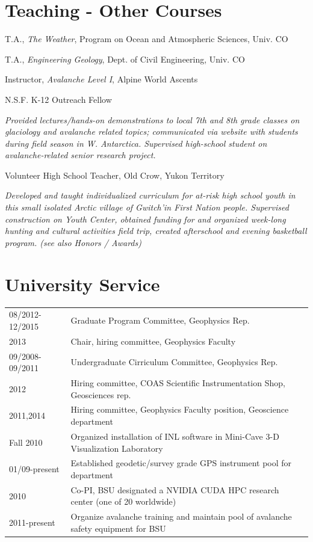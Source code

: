 \documentclass[11pt]{article}
\renewenvironment{itemize}{
  \begin{list}{}{
    \setlength{\leftmargin}{1.5em}
    \setlength{\itemsep}{0pt}
    \setlength{\parskip}{0pt}
  }
}{
  \end{list}
}
\renewcommand\arraystretch{1}
\begin{document}
\section*{Teaching - Other Courses}
\begin{itemize}
\item[01/2003-06/2003] T.A., \textit{The Weather}, Program on Ocean and Atmospheric Sciences, Univ. CO
\item[01/2000-06/2000] T.A., \textit{Engineering Geology}, Dept. of Civil Engineering, Univ. CO
\item[12/2002-12/2003] Instructor, \textit{Avalanche Level I}, Alpine World Ascents
\item[08/2001-06/2002] N.S.F. K-12 Outreach Fellow
\item \textit{Provided lectures/hands-on demonstrations to local 7th and 8th grade 
classes on glaciology and avalanche related topics; communicated via website with students 
during field season in W. Antarctica. Supervised high-school student on avalanche-related 
senior research project.}

\pagebreak

\item[09/1999-03/2000] Volunteer High School Teacher, Old Crow, Yukon Territory
\item \textit{Developed and taught individualized curriculum for at-risk high school youth in this 
small isolated Arctic village of Gwitch'in First Nation people.  Supervised construction 
on Youth Center, obtained funding for and organized week-long hunting and cultural 
activities field trip, created afterschool and evening basketball program. (see also Honors 
/ Awards)}
\end{itemize}

\section*{University Service}
\begingroup
\renewcommand\arraystretch{0.7}
\begin{longtable}{p{1.2in}|p{5.7in}}
08/2012-12/2015 & Graduate Program Committee, Geophysics Rep. \\
2013 & Chair, hiring committee, Geophysics Faculty \\ 
09/2008-09/2011 & Undergraduate Cirriculum Committee, Geophysics Rep. \\
2012 & Hiring committee, COAS Scientific Instrumentation Shop, Geosciences rep. \\
2011,2014 & Hiring committee, Geophysics Faculty position, Geoscience department \\
Fall 2010 & Organized installation of INL software in Mini-Cave 3-D Visualization Laboratory \\
01/09-present & Established geodetic/survey grade GPS instrument pool for department \\
2010 & Co-PI, BSU designated a NVIDIA CUDA HPC research center (one of 20 worldwide)  \\
2011-present & Organize avalanche training and maintain pool of avalanche safety equipment for BSU \\ 
\end{longtable}
\endgroup
\end{document}
